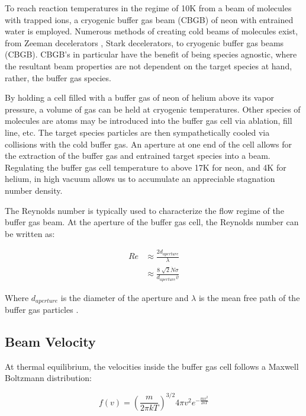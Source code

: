 To reach reaction temperatures in the regime of 10K from a beam of molecules with trapped ions, a cryogenic buffer gas beam (CBGB) of neon with entrained water is employed. Numerous methods of creating cold beams of molecules exist, from Zeeman decelerators \cite{Narevicius2008}, Stark decelerators, to cryogenic buffer gas beams (CBGB). CBGB's in particular have the benefit of being species agnostic, where the resultant beam properties are not dependent on the target species at hand, rather, the buffer gas species. 

By holding a cell filled with a buffer gas of neon of helium above its vapor pressure, a volume of gas can be held at cryogenic temperatures. Other species of molecules are atoms may be introduced into the buffer gas cell via ablation, fill line, etc. The target species particles are then sympathetically cooled via collisions with the cold buffer gas. An aperture at one end of the cell allows for the extraction of the buffer gas and entrained target species into a beam. Regulating the buffer gas cell temperature to above 17K for neon, and 4K for helium, in high vacuum allows us to accumulate an appreciable stagnation number density.

The Reynolds number is typically used to characterize the flow regime of the buffer gas beam. At the aperture of the buffer gas cell, the Reynolds number can be written as:

\begin{align}
	Re & \approx \frac{2 d_{aperture}}{\lambda} \nonumber \\
	& \approx \frac{8\sqrt[]{2} \dot{N} \sigma}{d_{aperture} \bar{v}} \label{eq: reynolds}
\end{align}

Where $d_{aperture}$ is the diameter of the aperture and $\lambda$ is the mean free path of the buffer gas particles \cite{Hutzler2012}.

\subsection{Beam Velocity}

At thermal equilibrium, the velocities inside the buffer gas cell follows a Maxwell Boltzmann distribution:

\begin{equation}
	f(v) = \left(\frac{m}{2 \pi k T}\right)^{3/2}4 \pi v^2 e^{-\frac{m v^2}{2 k T}} \label{eq: mb_distribution}
\end{equation}

